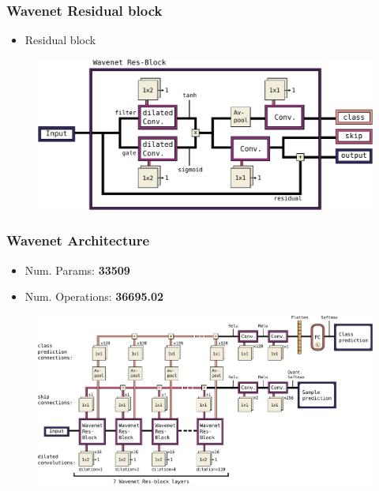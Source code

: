 \begin{frame}
  \frametitle{Wavenet Residual block}
  \vspace{-0.5cm}
  \begin{itemize}
    \item Residual block
  \end{itemize}
  \begin{figure} \includegraphics[height=0.45\textheight]{../4_nn/figs/nn_arch_wavenet_block.pdf} \end{figure}
\end{frame}

\begin{frame}
  \frametitle{Wavenet Architecture}
  \vspace{-0.5cm}
  \begin{itemize}
    \item Num. Params: \textbf{\num{33509}}
    \item Num. Operations: \textbf{\SI{36695.02}{\kilo\ops}}
  \end{itemize}
  \begin{figure} \includegraphics[height=0.5\textheight]{../4_nn/figs/nn_arch_wavenet_all.pdf} \end{figure}
\end{frame}